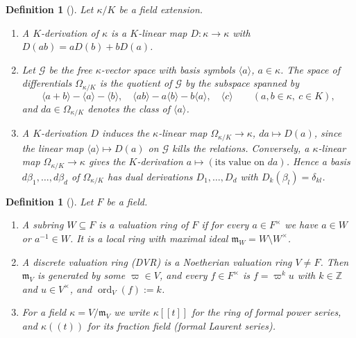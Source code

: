 \documentclass[pdflatex,sn-mathphys-num]{sn-jnl}
\numberwithin{equation}{section}
\theoremstyle{thmstyleone}
\newtheorem{definition}[theorem]{Definition}
\theoremstyle{thmstyletwo}
\begin{document}
\begin{definition}[{\cite[§25]{matsumura}}]\label{def:omega}
Let $\kappa/K$ be a field extension.
\begin{enumerate}[label=(\alph*)]
\item A \emph{$K$-derivation} of $\kappa$ is a $K$-linear map
$D\colon\kappa\to\kappa$ with $D(ab)=aD(b)+bD(a)$.
\item Let $\mathcal G$ be the free $\kappa$-vector space with basis symbols
$\langle a\rangle$, $a\in\kappa$. The space of \emph{differentials}
$\Omega_{\kappa/K}$ is the quotient of $\mathcal G$ by the subspace spanned by
\[
 \langle a+b\rangle-\langle a\rangle-\langle b\rangle,\quad
 \langle ab\rangle-a\langle b\rangle-b\langle a\rangle,\quad
 \langle c\rangle\qquad(a,b\in\kappa,\ c\in K),
\]
and $da\in\Omega_{\kappa/K}$ denotes the class of $\langle a\rangle$.
\item A $K$-derivation $D$ induces the $\kappa$-linear map
$\Omega_{\kappa/K}\to\kappa$, $da\mapsto D(a)$, since the linear map
$\langle a\rangle\mapsto D(a)$ on $\mathcal G$ kills the relations. Conversely, a
$\kappa$-linear map $\Omega_{\kappa/K}\to\kappa$ gives the $K$-derivation
$a\mapsto(\text{its value on }da)$. Hence a basis $d\beta_1,\dots,d\beta_d$ of
$\Omega_{\kappa/K}$ has dual derivations $D_1,\dots,D_d$ with
$D_k(\beta_l)=\delta_{kl}$.
\end{enumerate}
\end{definition}
\begin{definition}[{\cite[§10-§11]{matsumura}}]\label{def:valuation}
Let $F$ be a field. 
\begin{enumerate}[label=(\alph*)]
\item A subring $W\subseteq F$ is a \emph{valuation ring} of $F$ if for
every $a\in F^\times$ we have $a\in W$ or $a^{-1}\in W$. It is a local ring with
maximal ideal $\mathfrak m_W=W\setminus W^\times$. 
\item A \emph{discrete valuation ring} (DVR) is a Noetherian valuation ring $V\ne F$. Then $\mathfrak m_V$ is generated by some $\varpi\in V$, and every $f\in F^\times$ is $f=\varpi^ku$ with $k\in\mathbb Z$
and $u\in V^\times$, and $\operatorname{ord}_V(f):=k$. 
\item For a field $\kappa = V/\mathfrak m_V$ we write $\kappa[[t]]$ for the ring of formal power series, and $\kappa((t))$ for its fraction field (formal Laurent series).
\end{enumerate}
\end{definition}
\end{document}
